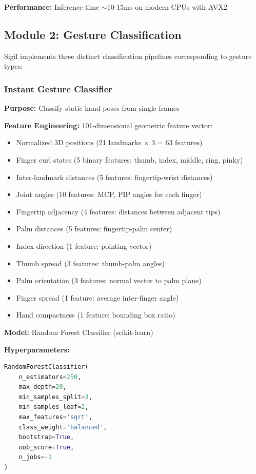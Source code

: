 \documentclass[11pt,a4paper]{article}
\begin{document}
\textbf{Performance:} Inference time $\sim$10-15ms on modern CPUs with AVX2

\subsection{Module 2: Gesture Classification}

Sigil implements three distinct classification pipelines corresponding to gesture types:

\subsubsection{Instant Gesture Classifier}

\textbf{Purpose:} Classify static hand poses from single frames

\textbf{Feature Engineering:} 101-dimensional geometric feature vector:
\begin{itemize}
\item Normalized 3D positions (21 landmarks × 3 = 63 features)
\item Finger curl states (5 binary features: thumb, index, middle, ring, pinky)
\item Inter-landmark distances (5 features: fingertip-wrist distances)
\item Joint angles (10 features: MCP, PIP angles for each finger)
\item Fingertip adjacency (4 features: distances between adjacent tips)
\item Palm distances (5 features: fingertip-palm center)
\item Index direction (1 feature: pointing vector)
\item Thumb spread (3 features: thumb-palm angles)
\item Palm orientation (3 features: normal vector to palm plane)
\item Finger spread (1 feature: average inter-finger angle)
\item Hand compactness (1 feature: bounding box ratio)
\end{itemize}

\textbf{Model:} Random Forest Classifier (scikit-learn)

\textbf{Hyperparameters:}
\begin{lstlisting}[language=Python]
RandomForestClassifier(
    n_estimators=250,
    max_depth=20,
    min_samples_split=3,
    min_samples_leaf=2,
    max_features='sqrt',
    class_weight='balanced',
    bootstrap=True,
    oob_score=True,
    n_jobs=-1
)
\end{lstlisting}
\end{document}
